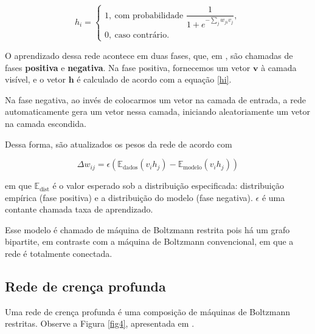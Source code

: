 \documentclass{article}
\begin{document}
            \begin{equation}
                h_i =   \begin{cases}
                            1, \ \textrm{com probabilidade } \dfrac{1}{1 + e^{-\sum_j w_{ji} v_j}},\\
                            0, \ \textrm{caso contrário}.
                        \end{cases}
                \label{hi}
            \end{equation}

            O aprendizado dessa rede acontece em duas fases, que, em \cite{testolin2018deep}, são chamadas de fases \textbf{positiva} e \textbf{negativa}.
            Na fase positiva, fornecemos um vetor $\mathbf{v}$ à camada visível, e o vetor $\mathbf{h}$ é calculado de acordo com a equação \ref{hi}.

            Na fase negativa, ao invés de colocarmos um vetor na camada de entrada, a rede automaticamente gera um vetor nessa camada, iniciando aleatoriamente um vetor na camada escondida.

            Dessa forma, são atualizados os pesos da rede de acordo com

            \begin{equation}
                \Delta w_{ij} = \epsilon(\mathbb{E}_{\textrm{dados}}(v_i h_j) - \mathbb{E}_{\textrm{modelo}}(v_i h_j))
            \end{equation}

            em que $\mathbb{E}_{\textrm{dist}}$ é o valor esperado sob a distribuição especificada: distribuição empírica (fase positiva) e a distribuição do modelo (fase negativa).
            $\epsilon$ é uma contante chamada taxa de aprendizado.
            
            Esse modelo é chamado de máquina de Boltzmann restrita pois há um grafo bipartite, em contraste com a máquina de Boltzmann convencional, em que a rede é totalmente conectada.

        \subsection{Rede de crença profunda}

            Uma rede de crença profunda é uma composição de máquinas de Boltzmann restritas. Observe a Figura \ref{fig4}, apresentada em \cite{testolin2018deep}.
\end{document}
